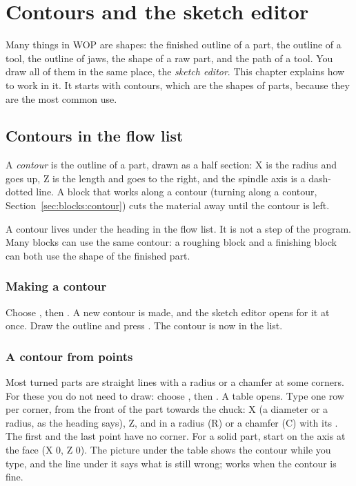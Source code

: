 \chapter{Contours and the sketch editor}\label{ch:contours}

Many things in WOP are shapes: the finished outline of a part, the outline of a tool, the outline of jaws, the shape of a raw part, and the path of a tool. You draw all of them in the same place, the \emph{sketch editor}. This chapter explains how to work in it. It starts with contours, which are the shapes of parts, because they are the most common use.

\section{Contours in the flow list}\label{sec:sketch:contours}

A \emph{contour} is the outline of a part, drawn as a half section: X is the radius and goes up, Z is the length and goes to the right, and the spindle axis is a dash-dotted line. A block that works along a contour (turning along a contour, Section~\ref{sec:blocks:contour}) cuts the material away until the contour is left.

A contour lives under the heading  in the flow list. It is not a step of the program. Many blocks can use the same contour: a roughing block and a finishing block can both use the shape of the finished part.

\subsection{Making a contour}
Choose , then . A new contour is made, and the sketch editor opens for it at once. Draw the outline and press . The contour is now in the list.

\subsection{A contour from points}
Most turned parts are straight lines with a radius or a chamfer at some corners. For these you do not need to draw: choose , then . A table opens. Type one row per corner, from the front of the part towards the chuck: X (a diameter or a radius, as the heading says), Z, and in  a radius (R) or a chamfer (C) with its . The first and the last point have no corner. For a solid part, start on the axis at the face (X 0, Z 0). The picture under the table shows the contour while you type, and the line under it says what is still wrong;  works when the contour is fine.

